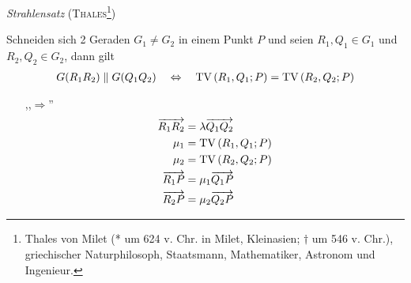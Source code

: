 \begin{mysatz}\textit{Strahlensatz} (\textsc{Thales}\footnote{Thales von Milet (* um 624 v. Chr. in Milet, Kleinasien; $\dagger$ um 546 v. Chr.), griechischer Naturphilosoph, Staatsmann, Mathematiker, Astronom und Ingenieur.})

    Schneiden sich 2 Geraden $G_1 \neq G_2$ in einem Punkt $P$ und seien $R_1, Q_1 \in G_1$ und $R_2, Q_2 \in G_2$, dann gilt
    \begin{align*}
        G(R_1 R_2) \parallel G(Q_1 Q_2) \quad \Leftrightarrow \quad \text{TV}\left( R_1, Q_1; P \right) = \text{TV}\left( R_2, Q_2; P \right)
    \end{align*}
    \begin{minipage}{0.6\textwidth}
        \begin{itemize}
            \item[,,$\Rightarrow$'']
                \begin{align*}
                    \overrightarrow{R_1 R_2} & = \lambda \overrightarrow{Q_1 Q_2}\\
                    \mu_1 & = \text{TV}\left( R_1, Q_1; P \right)\\
                    \mu_2 & = \text{TV}\left( R_2, Q_2; P \right)\\
                    \overrightarrow{R_1 P} & = \mu_1 \overrightarrow{Q_1 P}\\
                    \overrightarrow{R_2 P} & = \mu_2 \overrightarrow{Q_2 P}
                \end{align*}
        \end{itemize}
    \end{minipage}
    \begin{minipage}{0.4\textwidth}
        \begin{center}
        \end{center}

\end{minipage}
\end{mysatz}
